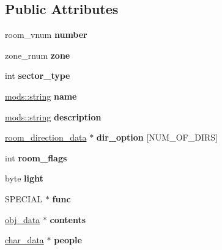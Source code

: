 \subsection*{Public Attributes}
\begin{DoxyCompactItemize}
\item 
\mbox{\label{structroom__data_ac02ddee80e6baae69013cfca076ad215}} 
room\+\_\+vnum {\bfseries number}
\item 
\mbox{\label{structroom__data_a0abda0c8a49d2b24dc06c11b9bef1dc4}} 
zone\+\_\+rnum {\bfseries zone}
\item 
\mbox{\label{structroom__data_adcba259049bfe3580ddba8f5ec8f14aa}} 
int {\bfseries sector\+\_\+type}
\item 
\mbox{\label{structroom__data_ade1a73004006f5a1ced7350c675eaa76}} 
\hyperlink{structmods_1_1string}{mods\+::string} {\bfseries name}
\item 
\mbox{\label{structroom__data_ad321243cda8b9a81ea8ee035a51d04f7}} 
\hyperlink{structmods_1_1string}{mods\+::string} {\bfseries description}
\item 
\mbox{\label{structroom__data_ad9454eca58e458b9b5eb29612577c3d6}} 
\hyperlink{structroom__direction__data}{room\+\_\+direction\+\_\+data} $\ast$ {\bfseries dir\+\_\+option} \mbox{[}N\+U\+M\+\_\+\+O\+F\+\_\+\+D\+I\+RS\mbox{]}
\item 
\mbox{\label{structroom__data_a84dbca4dc31fa5c684a622ae44729024}} 
int {\bfseries room\+\_\+flags}
\item 
\mbox{\label{structroom__data_a2b534af5a3f750c7205767661b568351}} 
byte {\bfseries light}
\item 
\mbox{\label{structroom__data_aae776b30a1dba3abc2824d845c3db650}} 
S\+P\+E\+C\+I\+AL $\ast$ {\bfseries func}
\item 
\mbox{\label{structroom__data_a02fe12382dbdd33e0c25a2db7ae11bc8}} 
\hyperlink{structobj__data}{obj\+\_\+data} $\ast$ {\bfseries contents}
\item 
\mbox{\label{structroom__data_a64f561d7e3b94fa7bd8ec3bc3d0e1d8f}} 
\hyperlink{structchar__data}{char\+\_\+data} $\ast$ {\bfseries people}
\end{DoxyCompactItemize}
